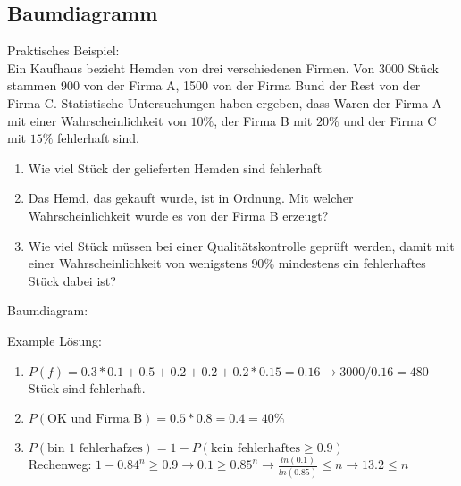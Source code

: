 \newpage
\subsection{Baumdiagramm}


\hfill \break


\hfill \break


\hfill \break
Praktisches Beispiel:\\
Ein Kaufhaus bezieht Hemden von drei verschiedenen Firmen. Von 3000 Stück stammen 900 von der Firma A, 1500 von
der Firma Bund der Rest von der Firma C. Statistische Untersuchungen haben ergeben, dass Waren der Firma A mit
einer Wahrscheinlichkeit von $10\%$, der Firma B mit $20\%$ und der Firma C mit $15\%$ fehlerhaft sind.
\begin{enumerate}
    \item Wie viel Stück der gelieferten Hemden sind fehlerhaft
    \item Das Hemd, das gekauft wurde, ist in Ordnung. Mit welcher Wahrscheinlichkeit wurde es von der Firma B erzeugt?
    \item Wie viel Stück müssen bei einer Qualitätskontrolle geprüft werden, damit mit einer Wahrscheinlichkeit von wenigstens $90\%$ mindestens ein fehlerhaftes Stück dabei ist?
\end{enumerate}


\hfill \break
Baumdiagram:\\


\hfill \break
Example Lösung:\\
\begin{enumerate}
    \item $P(f) = 0.3*0.1+0.5+0.2+0.2+0.2*0.15=0.16 \longrightarrow 3000/0.16 = 480$ Stück sind fehlerhaft.
    \item $P(\textrm{OK und Firma B}) = 0.5*0.8=0.4 = 40\%$
    \item $P(\textrm{bin 1 fehlerhafzes}) = 1-P(\textrm{kein fehlerhaftes}\geq 0.9)$\\ Rechenweg: $1-0.84^n \geq 0.9 \rightarrow 0.1 \geq 0.85^n \rightarrow \frac{ln(0.1)}{ln(0.85)} \leq n \rightarrow 13.2 \leq n$
\end{enumerate}
